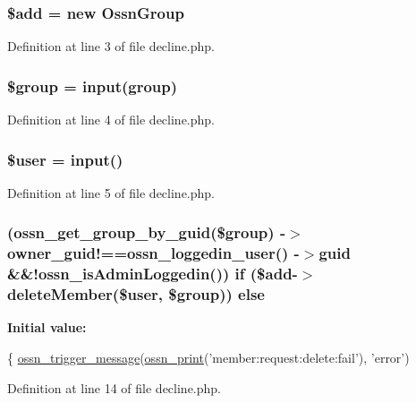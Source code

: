 \subsubsection[{\texorpdfstring{\$add}{$add}}]{\setlength{\rightskip}{0pt plus 5cm}\${\bf add} = new {\bf Ossn\+Group}}\hypertarget{decline_8php_a76aeb354fc71a358526ea9fbd7aae7a4}{}\label{decline_8php_a76aeb354fc71a358526ea9fbd7aae7a4}


Definition at line 3 of file decline.\+php.

\subsubsection[{\texorpdfstring{\$group}{$group}}]{\setlength{\rightskip}{0pt plus 5cm}\$group = {\bf input}(\textquotesingle{}group\textquotesingle{})}\hypertarget{decline_8php_ad530a85733b0ec1dc321859fd8faa0dc}{}\label{decline_8php_ad530a85733b0ec1dc321859fd8faa0dc}


Definition at line 4 of file decline.\+php.

\subsubsection[{\texorpdfstring{\$user}{$user}}]{\setlength{\rightskip}{0pt plus 5cm}\${\bf user} = {\bf input}(\textquotesingle{})}\hypertarget{decline_8php_a598ca4e71b15a1313ec95f0df1027ca5}{}\label{decline_8php_a598ca4e71b15a1313ec95f0df1027ca5}


Definition at line 5 of file decline.\+php.

\subsubsection[{\texorpdfstring{else}{else}}]{ ({\bf ossn\+\_\+get\+\_\+group\+\_\+by\+\_\+guid}(\$group) -\/$>$owner\+\_\+guid!=={\bf ossn\+\_\+loggedin\+\_\+user}() -\/$>$guid \&\&!{\bf ossn\+\_\+is\+Admin\+Loggedin}()) {\bf if} (\${\bf add}-\/$>$delete\+Member(\${\bf user}, \$group)) else}\hypertarget{decline_8php_a4f1195684d7ac85781b27318fe34bbb0}{}\label{decline_8php_a4f1195684d7ac85781b27318fe34bbb0}
{\bfseries Initial value\+:}
\begin{DoxyCode}
\{
    \hyperlink{ossn_8lib_8system_8php_ab3f23f23f32f50c12e7aea0ffaccaac7}{ossn\_trigger\_message}(\hyperlink{ossn_8lib_8languages_8php_a2be5d1c4b695593a9b9067b96df2150a}{ossn\_print}(\textcolor{stringliteral}{'member:request:delete:fail'}), \textcolor{stringliteral}{'error'})
\end{DoxyCode}


Definition at line 14 of file decline.\+php.

